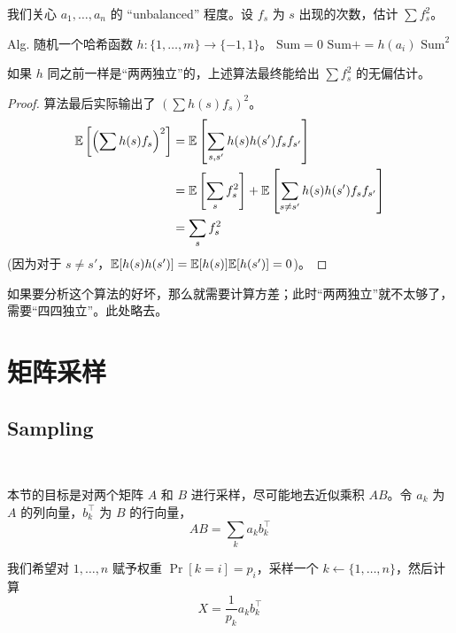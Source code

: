 我们关心 $a_1, \dots, a_n$ 的 ``unbalanced'' 程度。设 $f_s$ 为 $s$ 出现的次数，估计 $\sum f_s^2$。

\begin{algorithm}[h]
    \caption{}
    \begin{algorithmic}[1]
        \State Alg. 随机一个哈希函数 $h: \{1, \dots, m\} \to \{-1, 1\}$。
        \State $\mathrm{Sum} = 0$
            \State $\mathrm{Sum} += h(a_{i})$
        \EndFor
        \State \Return $\mathrm{Sum}^{2}$
    \end{algorithmic}
\end{algorithm}

\begin{theorem}
    如果 $h$ 同之前一样是“两两独立”的，上述算法最终能给出 $\sum f_s^2$ 的无偏估计。
\end{theorem}

\begin{proof}
    算法最后实际输出了 $(\sum h(s)f_{s})^2$。
    \begin{align*}
        \mathbb{E}\left[\left(\sum h(s)f_{s}\right)^{2}\right] &= \mathbb{E}\left[\sum_{s, s^{\prime}}h(s)h(s^{\prime})f_{s}f_{s^{\prime}}\right] \\
        &= \mathbb{E}\left[\sum_{s}f_{s}^{2}\right] + \mathbb{E}\left[\sum_{s\ne s^{\prime}}h(s)h(s^{\prime})f_{s}f_{s^{\prime}}\right] \\
        &= \sum_{s}f_{s}^{2}
    \end{align*}
    (因为对于 $s \ne s'$，$\mathbb{E}[h(s)h(s')] = \mathbb{E}[h(s)]\mathbb{E}[h(s')] = 0$)。
\end{proof}

如果要分析这个算法的好坏，那么就需要计算方差；此时“两两独立”就不太够了，需要“四四独立”。此处略去。

\section{矩阵采样}

\subsection{Sampling} ~

本节的目标是对两个矩阵 $A$ 和 $B$ 进行采样，尽可能地去近似乘积 $AB$。令 $a_k$ 为 $A$ 的列向量，$b_k^\top$ 为 $B$ 的行向量，
\[
    AB = \sum_{k} a_k b_k^\top
\]

我们希望对 $1, \dots, n$ 赋予权重 $\Pr[k=i]=p_{i}$，采样一个 $k \leftarrow \{1, \dots, n\}$，然后计算
\[
    X = \frac{1}{p_{k}}a_{k}b_{k}^{\top}
\]

